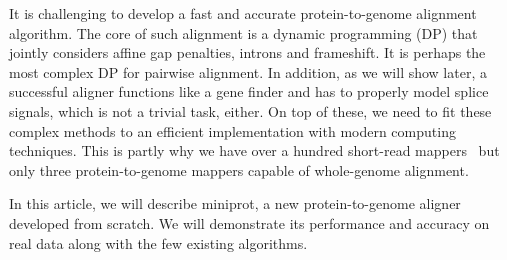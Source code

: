 \documentclass{bioinfo}
\begin{document}
It is challenging to develop a fast and accurate protein-to-genome alignment
algorithm. The core of such alignment is a dynamic programming (DP) that
jointly considers affine gap penalties, introns and frameshift. It is perhaps
the most complex DP for pairwise alignment. In addition, as we will show later,
a successful aligner functions like a gene finder and has to properly model
splice signals, which is not a trivial task, either. On top of these, we need
to fit these complex methods to an efficient implementation with modern
computing techniques. This is partly why we have over a hundred short-read
mappers~\citep{Alser:2021tk} but only three protein-to-genome mappers capable of
whole-genome alignment.

In this article, we will describe miniprot, a new protein-to-genome aligner
developed from scratch. We will demonstrate its performance and accuracy on
real data along with the few existing algorithms.
\end{document}
